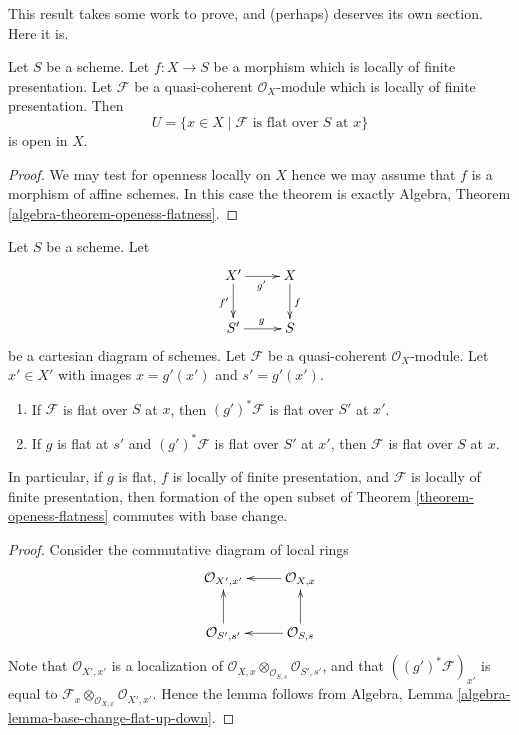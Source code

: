 \noindent
This result takes some work to prove, and (perhaps)
deserves its own section. Here it is.

\begin{theorem}
\label{theorem-openess-flatness}
Let $S$ be a scheme.
Let $f : X \to S$ be a morphism which is locally of finite presentation.
Let $\mathcal{F}$ be a quasi-coherent $\mathcal{O}_X$-module which is
locally of finite presentation. Then
$$
U = \{x \in X \mid \mathcal{F}\text{ is flat over }S\text{ at }x\}
$$
is open in $X$.
\end{theorem}

\begin{proof}
We may test for openness locally on $X$ hence we may assume
that $f$ is a morphism of affine schemes. In this case the
theorem is exactly
Algebra, Theorem \ref{algebra-theorem-openess-flatness}.
\end{proof}

\begin{lemma}
\label{lemma-flat-locus-base-change}
Let $S$ be a scheme.
Let
$$
\xymatrix{
X' \ar[r]_{g'} \ar[d]_{f'} & X \ar[d]^f \\
S' \ar[r]^g & S
}
$$
be a cartesian diagram of schemes.
Let $\mathcal{F}$ be a quasi-coherent $\mathcal{O}_X$-module.
Let $x' \in X'$ with images
$x = g'(x')$ and $s' = g'(x')$.
\begin{enumerate}
\item If $\mathcal{F}$ is flat over $S$ at $x$, then
$(g')^*\mathcal{F}$ is flat over $S'$ at $x'$.
\item If $g$ is flat at $s'$ and $(g')^*\mathcal{F}$ is flat over $S'$ at
$x'$, then $\mathcal{F}$ is flat over $S$ at $x$.
\end{enumerate}
In particular, if $g$ is flat, $f$ is locally of finite presentation,
and $\mathcal{F}$ is locally of finite presentation,
then formation of the open subset of
Theorem \ref{theorem-openess-flatness}
commutes with base change.
\end{lemma}

\begin{proof}
Consider the commutative diagram of local rings
$$
\xymatrix{
\mathcal{O}_{X', x'} & \mathcal{O}_{X, x} \ar[l] \\
\mathcal{O}_{S', s'} \ar[u] & \mathcal{O}_{S, s} \ar[l] \ar[u]
}
$$
Note that $\mathcal{O}_{X', x'}$
is a localization of
$\mathcal{O}_{X, x} \otimes_{\mathcal{O}_{S, s}} \mathcal{O}_{S', s'}$,
and that $((g')^*\mathcal{F})_{x'}$ is equal to
$\mathcal{F}_x \otimes_{\mathcal{O}_{X, x}} \mathcal{O}_{X', x'}$.
Hence the lemma follows from
Algebra, Lemma \ref{algebra-lemma-base-change-flat-up-down}.
\end{proof}






